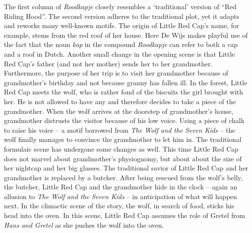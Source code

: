 The first column of \emph{Roodkapje} closely resembles a `traditional' version of ``Red Riding Hood''. The second version adheres to the traditional plot, yet it adapts and reworks many well-known motifs. The origin of Little Red Cap's name, for example, stems from the red roof of her house. Here De Wijs makes playful use of the fact that the noun \emph{kap} in the compound \emph{Roodkapje} can refer to both a cap and a roof in Dutch. Another small change in the opening scene is that Little Red Cap's father (and not her mother) sends her to her grandmother. Furthermore, the purpose of her trip is to visit her grandmother because of grandmother's birthday and not because granny has fallen ill. In the forest, Little Red Cap meets the wolf, who is rather fond of the biscuits the girl brought with her. He is not allowed to have any and therefore decides to take a piece of the grandmother. When the wolf arrives at the doorstep of grandmother's house, grandmother distrusts the visitor because of his low voice. Using a piece of chalk to raise his voice -- a motif borrowed from \emph{The Wolf and the Seven Kids} -- the wolf finally manages to convince the grandmother to let him in. The traditional formulaic scene has undergone some changes as well. This time Little Red Cap does not marvel about grandmother's physiognomy, but about about the size of her nightcap and her big glasses. The traditional savior of Little Red Cap and her grandmother is replaced by a butcher. After being rescued from the wolf's belly, the butcher, Little Red Cap and the grandmother hide in the clock -- again an allusion to \emph{The Wolf and the Seven Kids} -- in anticipation of what will happen next. In the climactic scene of the story, the wolf, in search of food, sticks his head into the oven. In this scene, Little Red Cap assumes the role of Gretel from \emph{Hans and Gretel} as she pushes the wolf into the oven.

